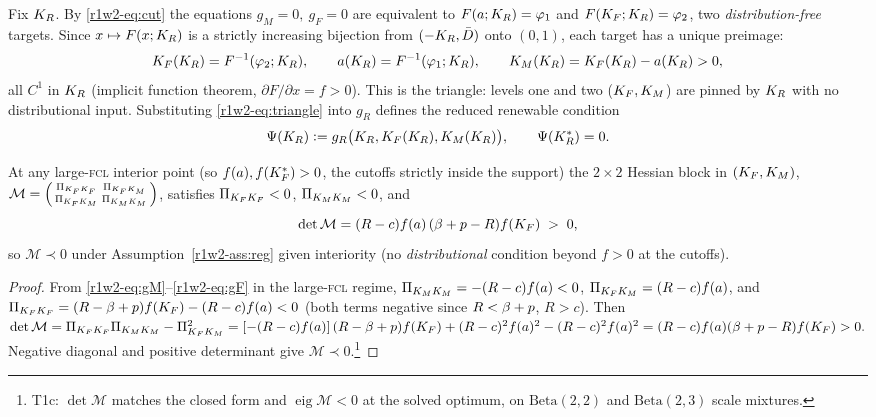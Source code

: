 Fix $K_R$. By \eqref{r1w2-eq:cut} the equations $g_M=0,\ g_F=0$ are equivalent to
$F(a;K_R)=\varphi_1$ and $F(K_F;K_R)=\varphi_2$, two \emph{distribution-free}
targets. Since $x\mapsto F(x;K_R)$ is a strictly increasing bijection from
$(-K_R,\bar D)$ onto $(0,1)$, each target has a unique preimage:
\begin{equation}\label{r1w2-eq:triangle}
  K_F(K_R)=F^{-1}(\varphi_2;K_R),\qquad
  a(K_R)=F^{-1}(\varphi_1;K_R),\qquad
  K_M(K_R)=K_F(K_R)-a(K_R)>0 ,
\end{equation}
all $C^{1}$ in $K_R$ (implicit function theorem, $\partial F/\partial x=f>0$).
This is the triangle: levels one and two ($K_F,K_M$) are pinned by $K_R$ with no
distributional input. Substituting \eqref{r1w2-eq:triangle} into $g_R$ defines the
reduced renewable condition
\begin{equation}\label{r1w2-eq:Psi}
  \Psi(K_R)\vcentcolon= g_R\big(K_R,K_F(K_R),K_M(K_R)\big),\qquad \Psi(K_R^{*})=0 .
\end{equation}

\begin{lemma}\label{r1w2-lem:block}
At any large-\textsc{fcl} interior point (so $f(a),f(K_F^{*})>0$, the cutoffs strictly
inside the support) the $2\times2$ Hessian block in
$(K_F,K_M)$,
$\mathcal M=\begin{psmallmatrix} \Pi_{K_FK_F}&\Pi_{K_FK_M}\\ \Pi_{K_FK_M}&\Pi_{K_MK_M}\end{psmallmatrix}$,
satisfies $\Pi_{K_FK_F}<0$, $\Pi_{K_MK_M}<0$, and
\[
  \det\mathcal M=(R-c)f(a)\,(\beta+p-R)f(K_F)\;>\;0 ,
\]
so $\mathcal M\prec0$ under Assumption~\ref{r1w2-ass:reg} given interiority (no \emph{distributional} condition beyond $f>0$ at the cutoffs).
\end{lemma}

\begin{proof}
From \eqref{r1w2-eq:gM}--\eqref{r1w2-eq:gF} in the large-\textsc{fcl} regime,
$\Pi_{K_MK_M}=-(R-c)f(a)<0$, $\Pi_{K_FK_M}=(R-c)f(a)$, and
$\Pi_{K_FK_F}=(R-\beta+p)f(K_F)-(R-c)f(a)<0$ (both terms negative since $R<\beta+p$,
$R>c$). Then
$\det\mathcal M=\Pi_{K_FK_F}\Pi_{K_MK_M}-\Pi_{K_FK_M}^{2}
=[-(R-c)f(a)]\,(R-\beta+p)f(K_F)+(R-c)^{2}f(a)^{2}-(R-c)^{2}f(a)^{2}
=(R-c)f(a)(\beta+p-R)f(K_F)>0.$
Negative diagonal and positive determinant give $\mathcal M\prec0$.\footnote{T1c:
$\det\mathcal M$ matches the closed form and $\operatorname{eig}\mathcal M<0$ at
the solved optimum, on $\mathrm{Beta}(2,2)$ and $\mathrm{Beta}(2,3)$ scale
mixtures.}
\end{proof}

